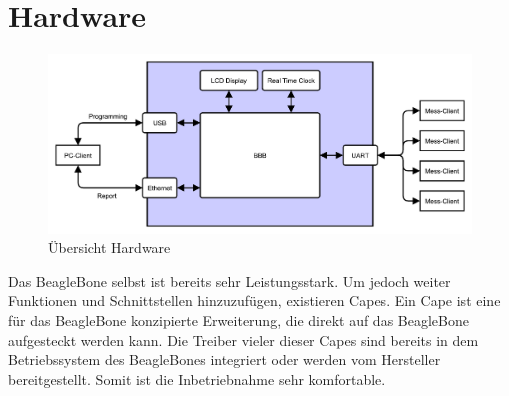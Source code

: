 
\section{Hardware}
\label{ServerHardware}

\begin{figure}[H]
\begin{center}
\includegraphics[width=\textwidth ]{img/general/UebersichtMaster.pdf}
\caption{Übersicht Hardware}
\label{figure_AufbauBleagleBone}
\end{center}
\end{figure}

Das BeagleBone selbst ist bereits sehr Leistungsstark. Um jedoch weiter Funktionen und Schnittstellen hinzuzufügen, existieren Capes. Ein Cape ist eine für das BeagleBone konzipierte Erweiterung, die direkt auf das BeagleBone aufgesteckt werden kann. Die Treiber vieler dieser Capes sind bereits in dem Betriebssystem des BeagleBones integriert oder werden vom Hersteller bereitgestellt. Somit ist die Inbetriebnahme sehr komfortable.


